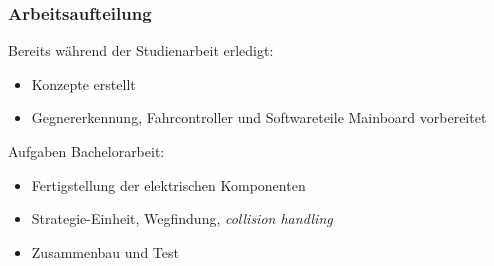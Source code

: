 \begin{frame}
\begin{figure}
	\end{figure}

\end{frame}

\begin{frame}
	\frametitle{Arbeitsaufteilung}
	Bereits während der Studienarbeit erledigt:
	\begin{itemize}
		\item Konzepte erstellt
		\item Gegnererkennung, Fahrcontroller und Softwareteile Mainboard vorbereitet
	\end{itemize}
	\vspace{1em}
	Aufgaben Bachelorarbeit:
	\begin{itemize}
	   	\item Fertigstellung der elektrischen Komponenten
	   	\item Strategie-Einheit, Wegfindung, \textit{collision handling}
	   	\item Zusammenbau und Test
	\end{itemize}

\end{frame}